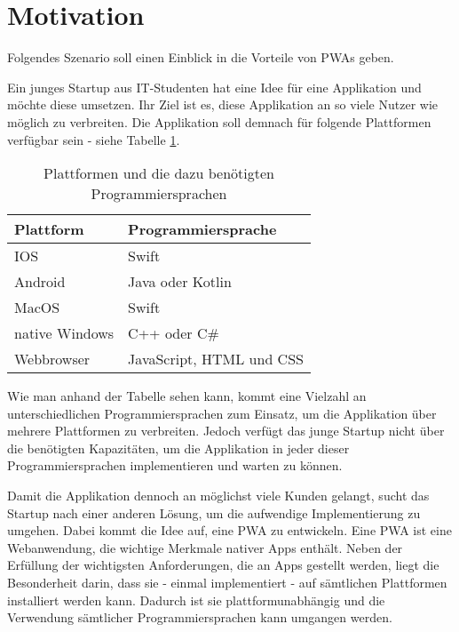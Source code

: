 
\section{Motivation} \label{se:Motivation}

Folgendes Szenario soll einen Einblick in die Vorteile von \ac{PWAs} geben. 

Ein junges Startup aus IT-Studenten hat eine Idee für eine Applikation und möchte diese umsetzen. Ihr Ziel ist es, diese Applikation an so viele Nutzer wie möglich zu verbreiten. Die Applikation soll demnach für folgende Plattformen verfügbar sein - siehe Tabelle \ref{plattformen}.

\begin{table}[!htb]
\begin{tabularx}{\textwidth}{|X|X|}
    \hline
    \textbf{Plattform} & \textbf{Programmiersprache} \\
    \hline
    \hline
    IOS & Swift \\
    \hline
    Android & Java oder Kotlin\\
    \hline
    MacOS & Swift \\
    \hline 
    native Windows & C++ oder C\# \\
    \hline
    Webbrowser & JavaScript, HTML und CSS \\
    \hline
\end{tabularx}
\caption{Plattformen und die dazu benötigten Programmiersprachen}
\label{plattformen}
\end{table}

Wie man anhand der Tabelle sehen kann, kommt eine Vielzahl an unterschiedlichen Programmiersprachen zum Einsatz, um die Applikation über mehrere Plattformen zu verbreiten. Jedoch verfügt das junge Startup nicht über die benötigten Kapazitäten, um die Applikation in jeder dieser Programmiersprachen implementieren und warten zu können. 

Damit die Applikation dennoch an möglichst viele Kunden gelangt, sucht das Startup nach einer anderen Lösung, um die aufwendige Implementierung zu umgehen. Dabei kommt die Idee auf, eine \ac{PWA} zu entwickeln. Eine PWA ist eine Webanwendung, die wichtige Merkmale nativer Apps enthält. Neben der Erfüllung der wichtigsten Anforderungen, die an Apps gestellt werden, liegt die Besonderheit darin, dass sie - einmal implementiert - auf sämtlichen Plattformen installiert werden kann. Dadurch ist sie plattformunabhängig und die Verwendung sämtlicher Programmiersprachen kann umgangen werden.

